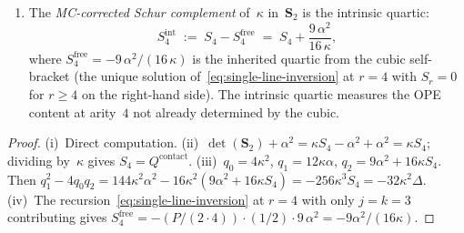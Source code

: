 \begin{proposition}
\begin{enumerate}[label=\textup{(\roman*)}]
\begin{equation}
  Q^{\mathrm{contact}}
  \;=\;
  -\frac{\operatorname{disc}(Q_L)}{256\,\kappa^3}.
\end{equation}
\item
The \emph{MC-corrected Schur complement}
of~$\kappa$ in~$\mathbf{S}_2$ is the intrinsic quartic:
\begin{equation}\label{eq:intrinsic-quartic-schur}
  S_4^{\mathrm{int}}
  \;:=\;
  S_4 - S_4^{\mathrm{free}}
  \;=\;
  S_4 + \frac{9\,\alpha^2}{16\,\kappa},
\end{equation}
where $S_4^{\mathrm{free}} = -9\,\alpha^2/(16\,\kappa)$
is the inherited quartic from the cubic self-bracket
\textup{(}the unique solution
of~\eqref{eq:single-line-inversion}
at $r = 4$ with $S_r = 0$ for $r \geq 4$
on the right-hand side\textup{)}.
The intrinsic quartic measures the OPE content
at arity~$4$ not already determined by the cubic.
\end{enumerate}
\end{proposition}

\begin{proof}
(i)~Direct computation.
(ii)~$\det(\mathbf{S}_2) + \alpha^2
= \kappa S_4 - \alpha^2 + \alpha^2 = \kappa S_4$;
dividing by~$\kappa$ gives $S_4 = Q^{\mathrm{contact}}$.
(iii)~$q_0 = 4\kappa^2$, $q_1 = 12\kappa\alpha$,
$q_2 = 9\alpha^2 + 16\kappa S_4$.  Then
$q_1^2 - 4 q_0 q_2
= 144\kappa^2\alpha^2
- 16\kappa^2(9\alpha^2 + 16\kappa S_4)
= -256\kappa^3 S_4 = -32\kappa^2\Delta$.
(iv)~The recursion~\eqref{eq:single-line-inversion}
at $r = 4$ with only $j = k = 3$ contributing gives
$S_4^{\mathrm{free}} = -(P/(2 \cdot 4))
\cdot (1/2) \cdot 9\,\alpha^2
= -9\alpha^2/(16\kappa)$.
\end{proof}

